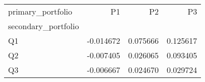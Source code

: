 \begin{tabular}{lrrr}
\toprule
primary_portfolio & P1 & P2 & P3 \\
secondary_portfolio &  &  &  \\
\midrule
Q1 & -0.014672 & 0.075666 & 0.125617 \\
Q2 & -0.007405 & 0.026065 & 0.093405 \\
Q3 & -0.006667 & 0.024670 & 0.029724 \\
\bottomrule
\end{tabular}
